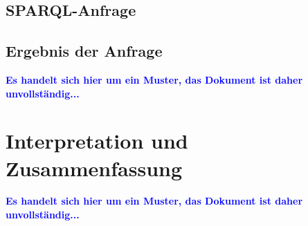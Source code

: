 \documentclass[parskip]{scrartcl}
\begin{document}
\subsection{SPARQL-Anfrage}

\subsection{Ergebnis der Anfrage}


\textcolor{blue}{\textbf{Es handelt sich hier um ein Muster, das Dokument ist daher unvollständig...}}


\section{Interpretation und Zusammenfassung}

\textcolor{blue}{\textbf{Es handelt sich hier um ein Muster, das Dokument ist daher unvollständig...}}



\end{document}

